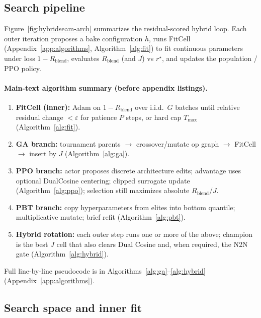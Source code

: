 \subsection{Search pipeline}
\label{sec:pipeline-overview}

Figure~\ref{fig:hybridseam-arch} summarizes the residual-scored hybrid loop.
Each outer iteration proposes a bake configuration $h$, runs FitCell (Appendix~\ref{app:algorithms}, Algorithm~\ref{alg:fit}) to fit continuous parameters under loss $1-R_{\mathrm{blend}}$, evaluates $R_{\mathrm{blend}}$ (and $J$) vs $r^{\star}$, and updates the population / PPO policy.

\paragraph{Main-text algorithm summary (before appendix listings).}
\begin{enumerate}
  \item \textbf{FitCell (inner):} Adam on $1-R_{\mathrm{blend}}$ over i.i.d.\ $G$ batches until relative residual change $<\varepsilon$ for patience $P$ steps, or hard cap $T_{\max}$ (Algorithm~\ref{alg:fit}).
  \item \textbf{GA branch:} tournament parents $\to$ crossover/mutate op graph $\to$ FitCell $\to$ insert by $J$ (Algorithm~\ref{alg:ga}).
  \item \textbf{PPO branch:} actor proposes discrete architecture edits; advantage uses optional DualCosine centering; clipped surrogate update (Algorithm~\ref{alg:ppo}); selection still maximizes absolute $R_{\mathrm{blend}}$/$J$.
  \item \textbf{PBT branch:} copy hyperparameters from elites into bottom quantile; multiplicative mutate; brief refit (Algorithm~\ref{alg:pbt}).
  \item \textbf{Hybrid rotation:} each outer step runs one or more of the above; champion is the best $J$ cell that also clears Dual Cosine and, when required, the N2N gate (Algorithm~\ref{alg:hybrid}).
\end{enumerate}
Full line-by-line pseudocode is in Algorithms~\ref{alg:ga}--\ref{alg:hybrid} (Appendix~\ref{app:algorithms}).



\subsection{Search space and inner fit}
\label{sec:search-space}

